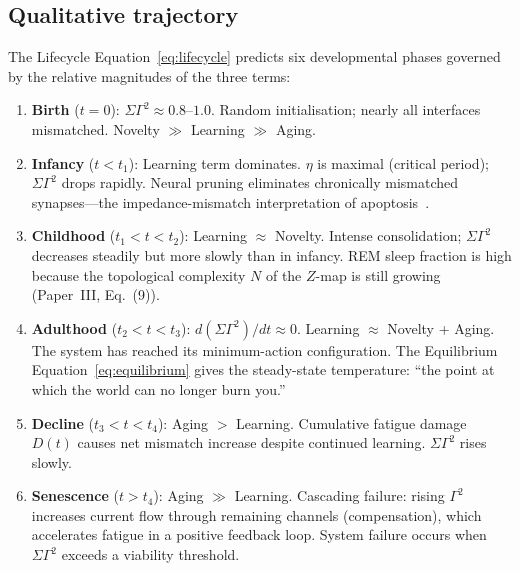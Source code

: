 ﻿\documentclass[aps,pre,twocolumn,superscriptaddress,floatfix]{revtex4-2}
\begin{document}
\subsection{Qualitative trajectory}

The Lifecycle Equation~\eqref{eq:lifecycle} predicts
six developmental phases governed by the relative
magnitudes of the three terms:

\begin{enumerate}
  \item \textbf{Birth} ($t = 0$):
    $\Sigma\Gamma^2 \approx 0.8$--$1.0$.
    Random initialisation; nearly all interfaces mismatched.
    Novelty $\gg$ Learning $\gg$ Aging.

  \item \textbf{Infancy} ($t < t_1$):
    Learning term dominates.
    $\eta$ is maximal (critical period);
    $\Sigma\Gamma^2$ drops rapidly.
    Neural pruning eliminates chronically mismatched
    synapses---the impedance-mismatch interpretation of
    apoptosis~\cite{Huttenlocher1979}.

  \item \textbf{Childhood} ($t_1 < t < t_2$):
    Learning $\approx$ Novelty.
    Intense consolidation; $\Sigma\Gamma^2$ decreases
    steadily but more slowly than in infancy.
    REM sleep fraction is high because the topological
    complexity $N$ of the $Z$-map is still growing
    (Paper~III, Eq.~(9)).

  \item \textbf{Adulthood} ($t_2 < t < t_3$):
    $d(\Sigma\Gamma^2)/dt \approx 0$.
    Learning $\approx$ Novelty + Aging.
    The system has reached its minimum-action configuration.
    The Equilibrium Equation~\eqref{eq:equilibrium} gives
    the steady-state temperature:
    ``the point at which the world can no longer burn you.''

  \item \textbf{Decline} ($t_3 < t < t_4$):
    Aging $>$ Learning.
    Cumulative fatigue damage $D(t)$ causes net mismatch
    increase despite continued learning.
    $\Sigma\Gamma^2$ rises slowly.

  \item \textbf{Senescence} ($t > t_4$):
    Aging $\gg$ Learning.
    Cascading failure: rising $\Gamma^2$ increases
    current flow through remaining channels (compensation),
    which accelerates fatigue in a positive feedback loop.
    System failure occurs when $\Sigma\Gamma^2$ exceeds
    a viability threshold.
\end{enumerate}
\end{document}
